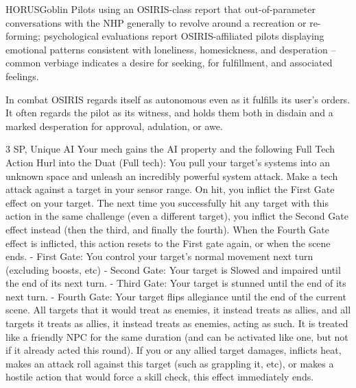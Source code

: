 \begin{mech}{HORUS}{Goblin}
Pilots using an OSIRIS-class report that out-of-parameter conversations with the NHP generally to revolve around a recreation or re-forming; psychological evaluations report OSIRIS-affiliated pilots displaying emotional patterns consistent with loneliness, homesickness, and desperation -- common verbiage indicates a desire for seeking, for fulfillment, and associated feelings.

In combat OSIRIS regards itself as autonomous even as it fulfills its user’s orders. It often regards the pilot as its witness, and holds them both in disdain and a marked desperation for approval, adulation, or awe.


3 SP, Unique
AI
Your mech gains the AI property and the following Full Tech Action
Hurl into the Duat (Full tech): You pull your target’s systems into an unknown space and unleash an incredibly powerful system attack. Make a tech attack against a target in your sensor range. On hit, you inflict the First Gate effect on your target. The next time you successfully hit any target with this action in the same challenge (even a different target), you inflict the Second Gate effect instead (then the third, and finally the fourth). When the Fourth Gate effect is inflicted, this action resets to the First gate again, or when the scene ends.
	- First Gate: You control your target’s normal movement next turn (excluding boosts, etc)
	- Second Gate: Your target is Slowed and impaired until the end of its next turn.
	- Third Gate: Your target is stunned until the end of its next turn.
	- Fourth Gate: Your target flips allegiance until the end of the current scene. All targets that it would treat as enemies, it instead treats as allies, and all targets it treats as allies, it instead treats as enemies, acting as such. It is treated like a friendly NPC for the same duration (and can be activated like one, but not if it already acted this round). If you or any allied target damages, inflicts heat, makes an attack roll against this target (such as grappling it, etc), or makes a hostile action that would force a skill check, this effect immediately ends.


\end{mech}
